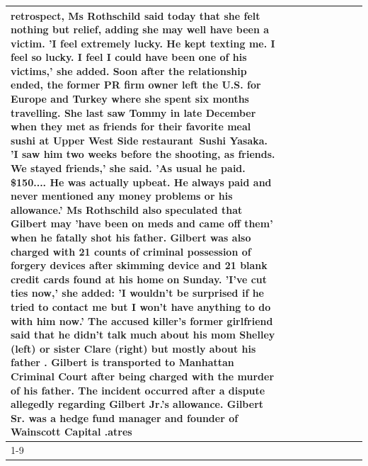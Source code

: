 \begin{table}[H]
\begin{tabular}{lllrlllll}
retrospect, Ms Rothschild said today that she felt nothing but relief, adding she may well have been a victim. 'I feel extremely lucky. He kept texting me. I feel so lucky. I feel I could have been one of his victims,' she added. Soon after the relationship ended, the former PR firm owner left the U.S. for Europe and Turkey where she spent six months  travelling. She last saw Tommy in late December when they met as friends for their favorite meal sushi at Upper West Side restaurant Sushi Yasaka. 'I saw him two weeks before the shooting, as friends. We stayed friends,' she said. 'As usual he paid. \$150.... He was actually upbeat. He always paid and never mentioned any money problems or his allowance.' Ms Rothschild also speculated that Gilbert may 'have been on meds and came off them' when he fatally shot his father. Gilbert was also charged with 21 counts of criminal possession of forgery devices after skimming device and 21 blank credit cards found at his home on Sunday. 'I've cut ties now,' she added: 'I wouldn’t be surprised if he tried to contact me but I won’t have anything to do with him now.' The accused killer's former girlfriend said that he didn't talk much about his mom Shelley (left) or sister Clare (right) but mostly about his father . Gilbert is transported to Manhattan Criminal Court  after being charged with the murder of his father. The incident occurred after a dispute allegedly regarding Gilbert Jr.'s allowance. Gilbert Sr. was a hedge fund manager and founder of Wainscott Capital .atres \\
\cline{1-9}

\end{tabular}
\end{table}
